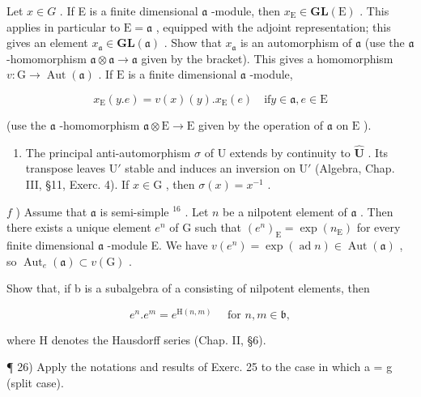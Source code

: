 Let \(x \in G\) . If E is a finite dimensional \(\mathfrak{a}\) -module, then \(x_{\mathrm{E}} \in \mathbf{GL}(\mathrm{E})\) . This applies in particular to \(\mathrm{E} = \mathfrak{a}\) , equipped with the adjoint representation; this gives an element \(x_{\mathfrak{a}} \in \mathbf{GL}(\mathfrak{a})\) . Show that \(x_{\mathfrak{a}}\) is an automorphism of \(\mathfrak{a}\) (use the \(\mathfrak{a}\) -homomorphism \(\mathfrak{a} \otimes \mathfrak{a} \to \mathfrak{a}\) given by the bracket). This gives a homomorphism \(v: \mathrm{G} \to \operatorname{Aut}(\mathfrak{a})\) . If \(\mathrm{E}\) is a finite dimensional \(\mathfrak{a}\) -module,

\[
x _ {\mathrm{E}} (y. e) = v (x) (y). x _ {\mathrm{E}} (e) \quad \mathrm{if} y \in \mathfrak {a}, e \in \mathrm{E}
\]

(use the \(\mathfrak{a}\) -homomorphism \(\mathfrak{a} \otimes \mathrm{E} \to \mathrm{E}\) given by the operation of \(\mathfrak{a}\) on \(\mathrm{E}\) ).

\begin{enumerate}
\def\labelenumi{\alph{enumi})}
\setcounter{enumi}{4}
\tightlist
\item
  The principal anti-automorphism \(\sigma\) of U extends by continuity to \(\hat{\mathbf{U}}\) . Its transpose leaves \(\mathrm{U}'\) stable and induces an inversion on \(\mathrm{U}'\) (Algebra, Chap. III, §11, Exerc. 4). If \(x \in \mathrm{G}\) , then \(\sigma(x) = x^{-1}\) .
\end{enumerate}

\(f\) ) Assume that \(\mathfrak{a}\) is semi-simple \(^{16}\) . Let \(n\) be a nilpotent element of \(\mathfrak{a}\) . Then there exists a unique element \(e^n\) of \(\mathrm{G}\) such that \((e^n)_{\mathrm{E}} = \exp (n_{\mathrm{E}})\) for every finite dimensional \(\mathfrak{a}\) -module E. We have \(v(e^n) = \exp (\operatorname {ad}n)\in \operatorname {Aut}(\mathfrak{a})\) , so \(\operatorname {Aut}_e(\mathfrak{a})\subset v(\mathrm{G})\) .

Show that, if b is a subalgebra of a consisting of nilpotent elements, then

\[
e ^ {n}. e ^ {m} = e ^ {\mathrm{H} (n, m)} \quad \text { for } n, m \in \mathfrak {b},
\]

where H denotes the Hausdorff series (Chap. II, §6).

¶ 26) Apply the notations and results of Exerc. 25 to the case in which a = g (split case).

